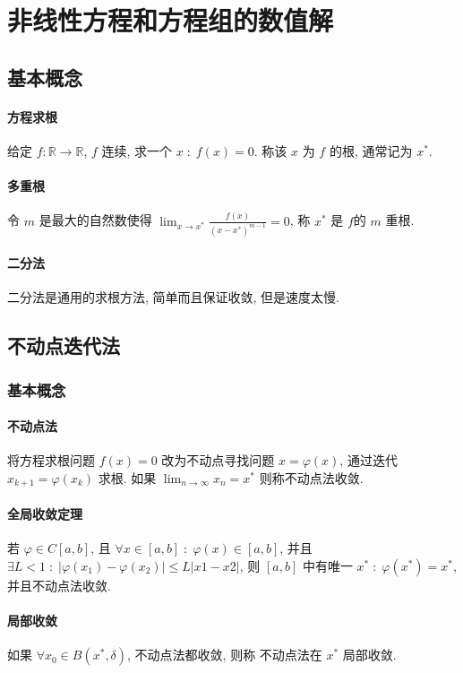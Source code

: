 \documentclass{ctexart}
\newcommand{\Rset}{\mathbb{R}}
\begin{document}
\section{非线性方程和方程组的数值解}
\subsection{基本概念}
\paragraph{方程求根}
    给定 $f: \Rset \to \Rset$, $f$ 连续, 求一个 $x\;:\; f(x) = 0$.
    称该 $x$ 为 $f$ 的根, 通常记为 $x^*$.
\paragraph{多重根}
    令 $m$ 是最大的自然数使得 $\lim_{x \to x^*} \frac{f(x)}{(x-x^*)^{m-1}} = 0$,
    称 $x^*$ 是 $f$的 $m$ 重根.
\paragraph{二分法}
    二分法是通用的求根方法, 简单而且保证收敛, 但是速度太慢.

\subsection{不动点迭代法}
\subsubsection{基本概念}
\paragraph{不动点法}
    将方程求根问题 $f(x) = 0$ 改为不动点寻找问题 $x = \varphi(x)$,
    通过迭代 $x_{k+1} = \varphi(x_k)$ 求根.
    如果 $\lim_{n\to\infty} x_n = x^*$ 则称不动点法收敛.
\paragraph{全局收敛定理}
    若 $\varphi \in C[a, b]$, 且 $\forall x \in [a,b]\;:\; \varphi(x) \in [a,b]$,
    并且 $\exists L < 1\;:\; |\varphi(x_1) - \varphi(x_2)| \le L |x1 - x2|$,
    则 $[a,b]$ 中有唯一 $x^*\;:\;\varphi(x^*) = x^*$, 并且不动点法收敛.
\paragraph{局部收敛}
    如果 $\forall x_0 \in B(x^*, \delta)$, 不动点法都收敛, 则称
    不动点法在 $x^*$ 局部收敛.
\end{document}
